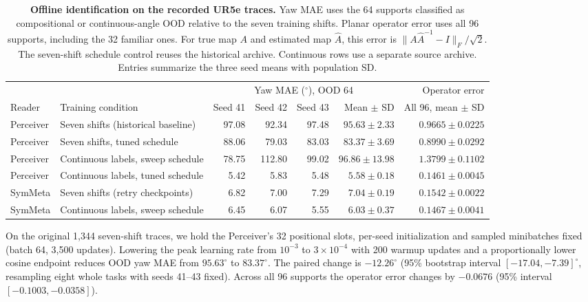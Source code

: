 \documentclass{article}
\theoremstyle{plain}
\theoremstyle{remark}
\begin{document}
\begin{table}[t]
  \centering
  \caption{\textbf{Offline identification on the recorded UR5e traces.} Yaw MAE uses the 64 supports classified as compositional or continuous-angle OOD relative to the seven training shifts. Planar operator error uses all 96 supports, including the 32 familiar ones. For true map $A$ and estimated map $\hat A$, this error is $\lVert A\hat A^{-1}-I\rVert_F/\sqrt{2}$. The seven-shift schedule control reuses the historical archive. Continuous rows use a separate source archive. Entries summarize the three seed means with population SD.}
  \label{tab:recorded}
  \small
  \begin{tabular}{llrrrrr}
    \toprule
    & & \multicolumn{4}{c}{Yaw MAE ($^\circ$), OOD 64} & Operator error \\
    \cmidrule(lr){3-6}
    Reader & Training condition & Seed 41 & Seed 42 & Seed 43 & Mean $\pm$ SD & All 96, mean $\pm$ SD \\
    \midrule
    Perceiver & Seven shifts (historical baseline) & 97.08 & 92.34 & 97.48 & $95.63\pm2.33$ & $0.9665\pm0.0225$ \\
    Perceiver & Seven shifts, tuned schedule & 88.06 & 79.03 & 83.03 & $83.37\pm3.69$ & $0.8990\pm0.0292$ \\
    Perceiver & Continuous labels, sweep schedule & 78.75 & 112.80 & 99.02 & $96.86\pm13.98$ & $1.3799\pm0.1102$ \\
    Perceiver & Continuous labels, tuned schedule & 5.42 & 5.83 & 5.48 & $5.58\pm0.18$ & $0.1461\pm0.0045$ \\
    SymMeta & Seven shifts (retry checkpoints) & 6.82 & 7.00 & 7.29 & $7.04\pm0.19$ & $0.1542\pm0.0022$ \\
    SymMeta & Continuous labels, sweep schedule & 6.45 & 6.07 & 5.55 & $6.03\pm0.37$ & $0.1467\pm0.0041$ \\
    \bottomrule
  \end{tabular}
\end{table}

On the original 1,344 seven-shift traces, we hold the Perceiver's 32 positional slots, per-seed initialization and sampled minibatches fixed (batch 64, 3,500 updates). Lowering the peak learning rate from $10^{-3}$ to $3\times10^{-4}$ with 200 warmup updates and a proportionally lower cosine endpoint reduces OOD yaw MAE from $95.63^\circ$ to $83.37^\circ$. The paired change is $-12.26^\circ$ (95\% bootstrap interval $[-17.04,-7.39]^\circ$, resampling eight whole tasks with seeds 41--43 fixed). Across all 96 supports the operator error changes by $-0.0676$ (95\% interval $[-0.1003,-0.0358]$).
\end{document}
